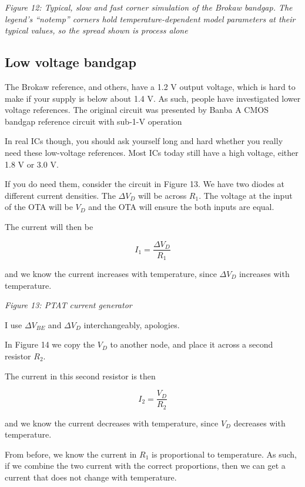 \emph{Figure 12: Typical, slow and fast corner simulation of the Brokaw
bandgap. The legend's ``notemp'' corners hold temperature-dependent
model parameters at their typical values, so the spread shown is process
alone}

\subsection{Low voltage bandgap}\label{low-voltage-bandgap}

The Brokaw reference, and others, have a 1.2 V output voltage, which is
hard to make if your supply is below about 1.4 V. As such, people have
investigated lower voltage references. The original circuit was
presented by Banba A CMOS bandgap reference circuit with sub-1-V
operation 

In real ICs though, you should ask yourself long and hard whether you
really need these low-voltage references. Most ICs today still have a
high voltage, either 1.8 V or 3.0 V.

If you do need them, consider the circuit in Figure 13. We have two
diodes at different current densities. The \(\Delta V_D\) will be across
\(R_1\). The voltage at the input of the OTA will be \(V_D\) and the OTA
will ensure the both inputs are equal.

The current will then be

\[ I_1 = \frac{\Delta V_{D}}{R_1}\]

and we know the current increases with temperature, since \(\Delta V_D\)
increases with temperature.


{
\centering
{}
}

\emph{Figure 13: PTAT current generator }

I use \(\Delta V_{BE}\) and \(\Delta V_D\) interchangeably, apologies.

In Figure 14 we copy the \(V_D\) to another node, and place it across a
second resistor \(R_2\).

The current in this second resistor is then

\[ I_2 = \frac{V_D}{R_2}\]

and we know the current decreases with temperature, since \(V_D\)
decreases with temperature.

From before, we know the current in \(R_1\) is proportional to
temperature. As such, if we combine the two current with the correct
proportions, then we can get a current that does not change with
temperature.


